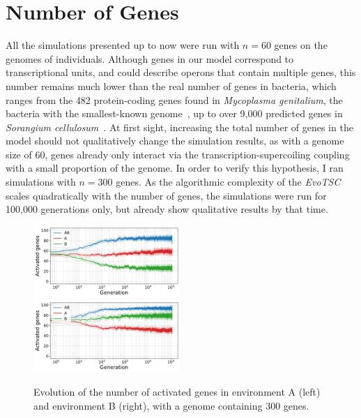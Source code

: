\FloatBlock


\section{Number of Genes}

All the simulations presented up to now were run with $n = 60$ genes on the genomes of individuals.
Although genes in our model correspond to transcriptional units, and could describe operons that contain multiple genes, this number remains much lower than the real number of genes in bacteria, which ranges from the 482 protein-coding genes found in \emph{Mycoplasma genitalium}, the bacteria with the smallest-known genome~\citep{glass2006}, up to over 9,000 predicted genes in \emph{Sorangium cellulosum}~\citep{schneiker2007}.
At first sight, increasing the total number of genes in the model should not qualitatively change the simulation results, as with a genome size of 60, genes already only interact via the transcription-supercoiling coupling with a small proportion of the genome.
In order to verify this hypothesis, I ran simulations with $n = 300$ genes.
As the algorithmic complexity of the \emph{EvoTSC} scales quadratically with the number of genes, the simulations were run for 100,000 generations only, but already show qualitative results by that time.

\begin{figure}[H]
\centering
\includegraphics[width=0.495\textwidth]{param/300-genes/gene_activity_env_A.pdf}
\includegraphics[width=0.495\textwidth]{param/300-genes/gene_activity_env_B.pdf}
\caption[Evolution of the number of activated genes in each environment, with a 300-gene genome]{Evolution of the number of activated genes in environment A (left) and environment B (right), with a genome containing 300 genes.}
\label{fig:param:300genes-activ-by-env}
\end{figure}


